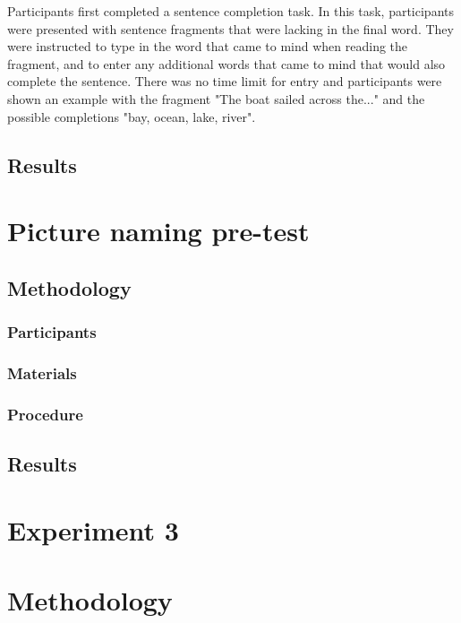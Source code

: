 Participants first completed a sentence completion task.  In this task, participants were presented with sentence fragments that were lacking in the final word.  They were instructed to type in the word that came to mind when reading the fragment, and to enter any additional words that came to mind that would also complete the sentence.  There was no time limit for entry and participants were shown an example with the fragment "The boat sailed across the..." and the possible completions "bay, ocean, lake, river".

\subsection{Results}

\section{Picture naming pre-test}

\subsection{Methodology}

\subsubsection{Participants}



\subsubsection{Materials}

\subsubsection{Procedure}


\subsection{Results}


\section{Experiment 3}

\section{Methodology}

